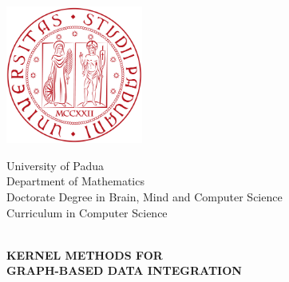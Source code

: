 \begin{titlepage}
	\begin{center}
	
		\includegraphics[width=4.5cm]{img/logoUnipd.png}

		
		\vspace{.5cm}
		\textrm{\LARGE University of Padua}
		\\[.1cm]
		\textrm{\Large Department of Mathematics\xspace}
		\\[.1cm]
		\textrm{\normalsize Doctorate Degree in Brain, Mind and Computer Science}
		\\[.1cm]
		\textrm{Curriculum in Computer Science}\\
		
		\vspace{.5cm}

		
		\vspace{1cm}
		
		\HRule \\
		\vspace{.5cm}
		\scshape{\LARGE\textbf{ KERNEL METHODS FOR} \\[0.25cm] \textbf{GRAPH-BASED DATA INTEGRATION}}\\
		\vspace{.4cm}
		
		\HRule\\
		\vspace{4cm}
		

\end{center}
\end{titlepage}
